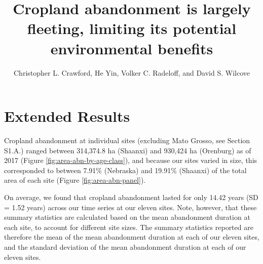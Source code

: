 \documentclass[9pt,lineno]{pnas-new}
\title{Cropland abandonment is largely fleeting, limiting its potential environmental benefits}
\author{Christopher L. Crawford, He Yin, Volker C. Radeloff, and David S. Wilcove}
\begin{document}
\verticaladjustment{-2pt}

\maketitle
\thispagestyle{firststyle}



\setcounter{figure}{0} \setcounter{section}{0} \setcounter{table}{0} \setcounter{equation}{0} \renewcommand{\thefigure}{S\arabic{figure}} \renewcommand{\thesection}{S\arabic{section}} \renewcommand{\thetable}{S\arabic{table}} \renewcommand\theequation{S\arabic{equation}}

\tableofcontents
\listoftables
\listoffigures

\newpage

\hypertarget{results-si}{%
\section{Extended Results}\label{results-si}}

Cropland abandonment at individual sites (excluding Mato Grosso, see Section S1.A.) ranged between 314,374.8 ha (Shaanxi) and 930,424 ha (Orenburg) as of 2017 (Figure \ref{fig:area-abn-by-age-class}), and because our sites varied in size, this corresponded to between 7.91\% (Nebraska) and 19.91\% (Shaanxi) of the total area of each site (Figure \ref{fig:area-abn-panel}).

On average, we found that cropland abandonment lasted for only 14.42 years (SD = 1.52 years) across our time series at our eleven sites.
Note, however, that these summary statistics are calculated based on the mean abandonment duration at each site, to account for different site sizes.
The summary statistics reported are therefore the mean of the mean abandonment duration at each of our eleven sites, and the standard deviation of the mean abandonment duration at each of our eleven sites.
\end{document}
